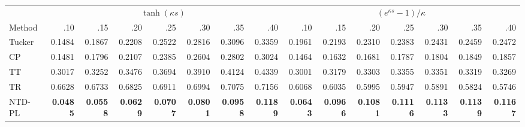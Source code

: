 \begin{tabular}{@{}lrrrrrrr@{\quad}rrrrrrr@{}}
\toprule
 & \multicolumn{7}{c}{\(\tanh(\kappa s)\)} & \multicolumn{7}{c}{\((e^{\kappa s}-1)/\kappa\)} \\
\cmidrule(lr){2-8}\cmidrule(l){9-15}
Method & .10 & .15 & .20 & .25 & .30 & .35 & .40 & .10 & .15 & .20 & .25 & .30 & .35 & .40 \\
\midrule
Tucker & 0.1484 & 0.1867 & 0.2208 & 0.2522 & 0.2816 & 0.3096 & 0.3359 & 0.1961 & 0.2193 & 0.2310 & 0.2383 & 0.2431 & 0.2459 & 0.2472 \\
CP & 0.1481 & 0.1796 & 0.2107 & 0.2385 & 0.2604 & 0.2802 & 0.3024 & 0.1464 & 0.1632 & 0.1681 & 0.1787 & 0.1804 & 0.1849 & 0.1857 \\
TT & 0.3017 & 0.3252 & 0.3476 & 0.3694 & 0.3910 & 0.4124 & 0.4339 & 0.3001 & 0.3179 & 0.3303 & 0.3355 & 0.3351 & 0.3319 & 0.3269 \\
TR & 0.6628 & 0.6733 & 0.6825 & 0.6911 & 0.6994 & 0.7075 & 0.7156 & 0.6068 & 0.6035 & 0.5995 & 0.5947 & 0.5891 & 0.5824 & 0.5746 \\
\midrule
NTD-PL & \textbf{0.0485} & \textbf{0.0558} & \textbf{0.0629} & \textbf{0.0707} & \textbf{0.0801} & \textbf{0.0958} & \textbf{0.1189} & \textbf{0.0643} & \textbf{0.0966} & \textbf{0.1081} & \textbf{0.1116} & \textbf{0.1133} & \textbf{0.1139} & \textbf{0.1167} \\
\bottomrule
\end{tabular}
